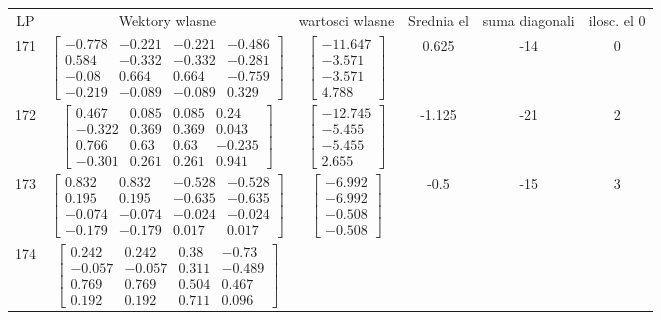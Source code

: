 \documentclass[a4paper,12pt]{article}
\begin{document}
\bgroup {} \vspace{0.2in} \begin{tabular}{c c c c c c}
LP &Wektory wlasne & wartosci wlasne & Srednia el & suma diagonali & ilosc. el 0\\
171
&
$\begin{bmatrix} -0.778 & -0.221 & -0.221 & -0.486 \\ 0.584 & -0.332 & -0.332 & -0.281 \\ -0.08 & 0.664 & 0.664 & -0.759 \\ -0.219 & -0.089 & -0.089 & 0.329 \end{bmatrix}$
&
$\begin{bmatrix} -11.647 \\ -3.571 \\ -3.571 \\ 4.788 \end{bmatrix}$
&
0.625
&
-14
&
0
\\
172
&
$\begin{bmatrix} 0.467 & 0.085 & 0.085 & 0.24 \\ -0.322 & 0.369 & 0.369 & 0.043 \\ 0.766 & 0.63 & 0.63 & -0.235 \\ -0.301 & 0.261 & 0.261 & 0.941 \end{bmatrix}$
&
$\begin{bmatrix} -12.745 \\ -5.455 \\ -5.455 \\ 2.655 \end{bmatrix}$
&
-1.125
&
-21
&
2
\\
173
&
$\begin{bmatrix} 0.832 & 0.832 & -0.528 & -0.528 \\ 0.195 & 0.195 & -0.635 & -0.635 \\ -0.074 & -0.074 & -0.024 & -0.024 \\ -0.179 & -0.179 & 0.017 & 0.017 \end{bmatrix}$
&
$\begin{bmatrix} -6.992 \\ -6.992 \\ -0.508 \\ -0.508 \end{bmatrix}$
&
-0.5
&
-15
&
3
\\
174
&
$\begin{bmatrix} 0.242 & 0.242 & 0.38 & -0.73 \\ -0.057 & -0.057 & 0.311 & -0.489 \\ 0.769 & 0.769 & 0.504 & 0.467 \\ 0.192 & 0.192 & 0.711 & 0.096 \end{bmatrix}$

\end{tabular}
\end{document}
